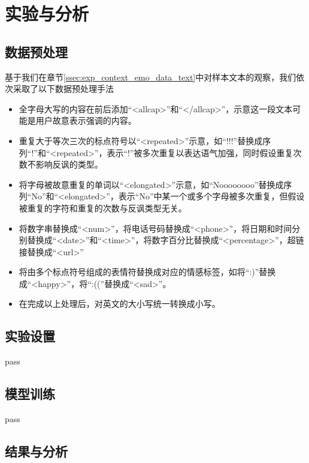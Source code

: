 \section{实验与分析}
\label{sec:exp_context_emo_exp}

\subsection{数据预处理}

基于我们在章节\ref{ssec:exp_context_emo_data_text}中对样本文本的观察，我们依次采取了以下数据预处理手法

\begin{itemize}

\item 全字母大写的内容在前后添加“<allcap>”和“</allcap>”，示意这一段文本可能是用户故意表示强调的内容。

\item 重复大于等次三次的标点符号以“<repeated>”示意，如“!!!”替换成序列“!”和“<repeated>”，表示“!”被多次重复以表达语气加强，同时假设重复次数不影响反讽的类型。

\item 将字母被故意重复的单词以“<elongated>”示意，如“Noooooooo”替换成序列“No”和“<elongated>”，表示“No”中某一个或多个字母被多次重复，但假设被重复的字符和重复的次数与反讽类型无关。

\item 将数字串替换成“<num>”，将电话号码替换成“<phone>”，将日期和时间分别替换成“<date>”和“<time>”，将数字百分比替换成“<percentage>”，超链接替换成“<url>”

\item 将由多个标点符号组成的表情符替换成对应的情感标签，如将“:)”替换成“<happy>”，将“:((”替换成“<sad>”。

\item 在完成以上处理后，对英文的大小写统一转换成小写。

\end{itemize}

\subsection{实验设置}

pass

\subsection{模型训练}

pass

\subsection{结果与分析}

